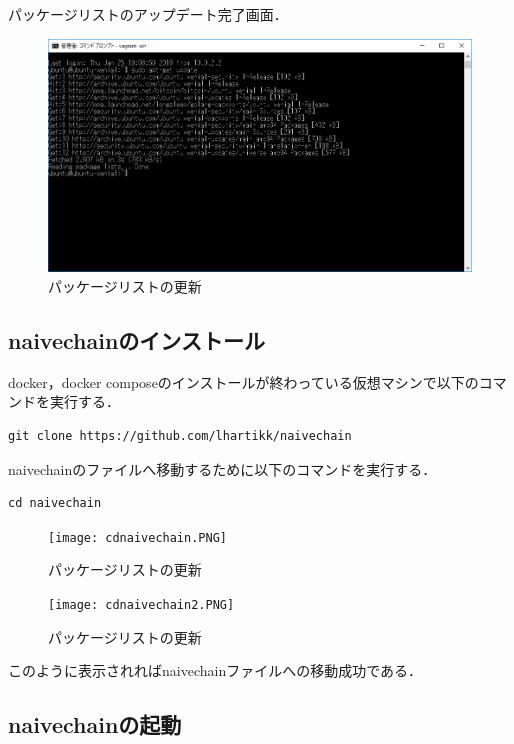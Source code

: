 パッケージリストのアップデート完了画面．
\begin{figure}[h]
\centering
\includegraphics[width=12cm]{sudoupdate.PNG}
\caption{パッケージリストの更新}\label{サンプル図}
\end{figure}


\newpage

\subsection{naivechainのインストール}

docker，docker composeのインストールが終わっている仮想マシンで以下のコマンドを実行する．

\begin{verbatim}
git clone https://github.com/lhartikk/naivechain
\end{verbatim}


naivechainのファイルへ移動するために以下のコマンドを実行する．

\begin{verbatim}
cd naivechain
\end{verbatim}

\begin{figure}[h]
\centering
\texttt{[image: cdnaivechain.PNG]}
\caption{パッケージリストの更新}\label{サンプル図}
\end{figure}


\newpage


\begin{figure}[h]
\centering
\texttt{[image: cdnaivechain2.PNG]}
\caption{パッケージリストの更新}\label{サンプル図}
\end{figure}


このように表示されればnaivechainファイルへの移動成功である．


\newpage


\subsection{naivechainの起動}


